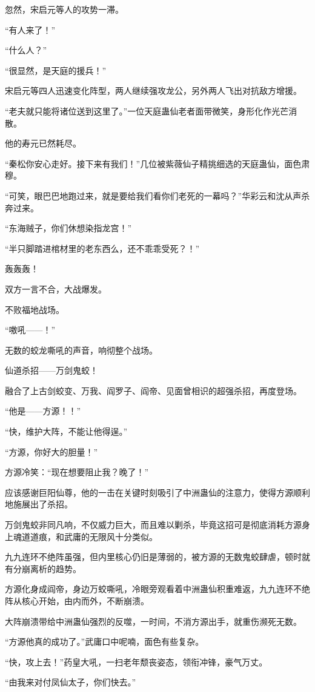 \begin{this_body}
忽然，宋启元等人的攻势一滞。

“有人来了！”

“什么人？”

“很显然，是天庭的援兵！”

宋启元等四人迅速变化阵型，两人继续强攻龙公，另外两人飞出对抗敌方增援。

“老夫就只能将诸位送到这里了。”一位天庭蛊仙老者面带微笑，身形化作光芒消散。

他的寿元已然耗尽。

“秦松你安心走好。接下来有我们！”几位被紫薇仙子精挑细选的天庭蛊仙，面色肃穆。

“可笑，眼巴巴地跑过来，就是要给我们看你们老死的一幕吗？”华彩云和沈从声杀奔过来。

“东海贼子，你们休想染指龙宫！”

“半只脚踏进棺材里的老东西么，还不乖乖受死？！”

轰轰轰！

双方一言不合，大战爆发。

不败福地战场。

“嗷吼——！”

无数的蛟龙嘶吼的声音，响彻整个战场。

仙道杀招——万剑鬼蛟！

融合了上古剑蛟变、万我、阎罗子、阎帝、见面曾相识的超强杀招，再度登场。

“他是——方源！！”

“快，维护大阵，不能让他得逞。”

“方源，你好大的胆量！”

方源冷笑：“现在想要阻止我？晚了！”

应该感谢巨阳仙尊，他的一击在关键时刻吸引了中洲蛊仙的注意力，使得方源顺利地施展出了杀招。

万剑鬼蛟非同凡响，不仅威力巨大，而且难以剿杀，毕竟这招可是彻底消耗方源身上魂道道痕，和武庸的无限风十分类似。

九九连环不绝阵虽强，但内里核心仍旧是薄弱的，被方源的无数鬼蛟肆虐，顿时就有分崩离析的趋势。

方源化身成阎帝，身边万蛟嘶吼，冷眼旁观看着中洲蛊仙积重难返，九九连环不绝阵从核心开始，由内而外，不断崩溃。

大阵崩溃带给中洲蛊仙强烈的反噬，一时间，不消方源出手，就重伤濒死无数。

“方源他真的成功了。”武庸口中呢喃，面色有些复杂。

“快，攻上去！”药皇大吼，一扫老年颓丧姿态，领衔冲锋，豪气万丈。

“由我来对付凤仙太子，你们快去。”


\end{this_body}
